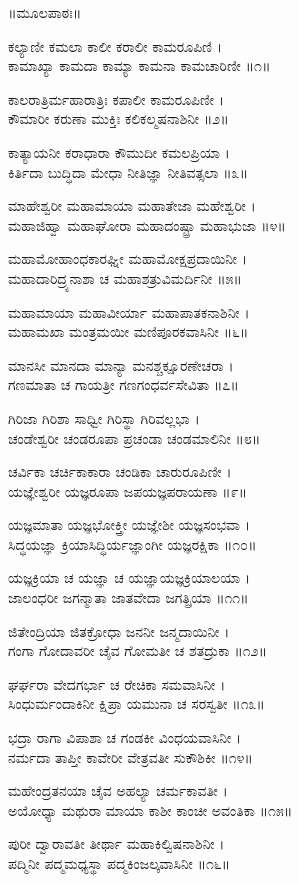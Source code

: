 ॥ಮೂಲಪಾಠಃ॥

ಕಲ್ಯಾಣೀ ಕಮಲಾ ಕಾಲೀ ಕರಾಲೀ ಕಾಮರೂಪಿಣಿ ।\\
ಕಾಮಾಖ್ಯಾ ಕಾಮದಾ ಕಾಮ್ಯಾ ಕಾಮನಾ ಕಾಮಚಾರಿಣೀ ॥೧॥

ಕಾಲರಾತ್ರಿರ್ಮಹಾರಾತ್ರಿಃ ಕಪಾಲೀ ಕಾಮರೂಪಿಣೀ ।\\
ಕೌಮಾರೀ ಕರುಣಾ ಮುಕ್ತಿಃ ಕಲಿಕಲ್ಮಷನಾಶಿನೀ ॥೨॥

ಕಾತ್ಯಾಯನೀ ಕರಾಧಾರಾ ಕೌಮುದೀ ಕಮಲಪ್ರಿಯಾ ।\\
ಕಿರ್ತಿದಾ ಬುದ್ಧಿದಾ ಮೇಧಾ ನೀತಿಜ್ಞಾ ನೀತಿವತ್ಸಲಾ ॥೩॥

ಮಾಹೇಶ್ವರೀ ಮಹಾಮಾಯಾ ಮಹಾತೇಜಾ ಮಹೇಶ್ವರೀ ।\\
ಮಹಾಜಿಹ್ವಾ ಮಹಾಘೋರಾ ಮಹಾದಂಷ್ಟ್ರಾ ಮಹಾಭುಜಾ ॥೪॥

ಮಹಾಮೋಹಾಂಧಕಾರಘ್ನೀ ಮಹಾಮೋಕ್ಷಪ್ರದಾಯಿನೀ ।\\
ಮಹಾದಾರಿದ್ರ್ಯನಾಶಾ ಚ ಮಹಾಶತ್ರುವಿಮರ್ದಿನೀ ॥೫॥

ಮಹಾಮಾಯಾ ಮಹಾವೀರ್ಯಾ ಮಹಾಪಾತಕನಾಶಿನೀ ।\\
ಮಹಾಮಖಾ ಮಂತ್ರಮಯೀ ಮಣಿಪೂರಕವಾಸಿನೀ ॥೬॥

ಮಾನಸೀ ಮಾನದಾ ಮಾನ್ಯಾ ಮನಶ್ಚಕ್ಷೂರಣೇಚರಾ ।\\
ಗಣಮಾತಾ ಚ ಗಾಯತ್ರೀ ಗಣಗಂಧರ್ವಸೇವಿತಾ ॥೭॥

ಗಿರಿಜಾ ಗಿರಿಶಾ ಸಾಧ್ವೀ ಗಿರಿಸ್ಥಾ ಗಿರಿವಲ್ಲಭಾ ।\\
ಚಂಡೇಶ್ವರೀ ಚಂಡರೂಪಾ ಪ್ರಚಂಡಾ ಚಂಡಮಾಲಿನೀ ॥೮॥

ಚರ್ವಿಕಾ ಚರ್ಚಿಕಾಕಾರಾ ಚಂಡಿಕಾ ಚಾರುರೂಪಿಣೀ ।\\
ಯಜ್ಞೇಶ್ವರೀ ಯಜ್ಞರೂಪಾ ಜಪಯಜ್ಞಪರಾಯಣಾ ॥೯॥

ಯಜ್ಞಮಾತಾ ಯಜ್ಞಭೋಕ್ತ್ರೀ ಯಜ್ಞೇಶೀ ಯಜ್ಞಸಂಭವಾ ।\\
ಸಿದ್ಧಯಜ್ಞಾ ಕ್ರಿಯಾಸಿದ್ಧಿರ್ಯಜ್ಞಾಂಗೀ ಯಜ್ಞರಕ್ಷಿಕಾ ॥೧೦॥

ಯಜ್ಞಕ್ರಿಯಾ ಚ ಯಜ್ಞಾ ಚ ಯಜ್ಞಾಯಜ್ಞಕ್ರಿಯಾಲಯಾ ।\\
ಜಾಲಂಧರೀ ಜಗನ್ಮಾತಾ ಜಾತವೇದಾ ಜಗತ್ಪ್ರಿಯಾ ॥೧೧॥

ಜಿತೇಂದ್ರಿಯಾ ಜಿತಕ್ರೋಧಾ ಜನನೀ ಜನ್ಮದಾಯಿನೀ ।\\
ಗಂಗಾ ಗೋದಾವರೀ ಚೈವ ಗೋಮತೀ ಚ ಶತದ್ರುಕಾ ॥೧೨॥

ಘರ್ಘರಾ ವೇದಗರ್ಭಾ ಚ ರೇಚಿಕಾ ಸಮವಾಸಿನೀ ।\\
ಸಿಂಧುರ್ಮಂದಾಕಿನೀ ಕ್ಷಿಪ್ರಾ ಯಮುನಾ ಚ ಸರಸ್ವತೀ ॥೧೩॥

ಭದ್ರಾ ರಾಗಾ ವಿಪಾಶಾ ಚ ಗಂಡಕೀ ವಿಂಧಯವಾಸಿನೀ ।\\
ನರ್ಮದಾ ತಾಪ್ತೀ ಕಾವೇರೀ ವೇತ್ರವತೀ ಸುಕೌಶಿಕೀ ॥೧೪॥

ಮಹೇಂದ್ರತನಯಾ ಚೈವ ಅಹಲ್ಯಾ ಚರ್ಮಕಾವತೀ ।\\
ಅಯೋಧ್ಯಾ ಮಥುರಾ ಮಾಯಾ ಕಾಶೀ ಕಾಂಚೀ ಅವಂತಿಕಾ ॥೧೫॥

ಪುರೀ ದ್ವಾರಾವತೀ ತೀರ್ಥಾ ಮಹಾಕಿಲ್ವಿಷನಾಶಿನೀ ।\\
ಪದ್ಮಿನೀ ಪದ್ಮಮಧ್ಯಸ್ಥಾ ಪದ್ಮಕಿಂಜಲ್ಕವಾಸಿನೀ ॥೧೬॥

